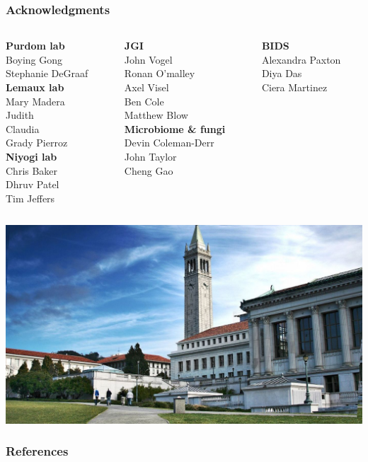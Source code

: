 \documentclass[xcolor=dvipsnames]{beamer}
\begin{document}
\begin{frame}
\frametitle{Acknowledgments}
\begin{center}
\begin{columns}
\begin{column}{0.3\linewidth}
\scriptsize
{\bf Purdom lab} \\
Boying Gong \\
Stephanie DeGraaf \\
\vspace{1em}
{\bf Lemaux lab} \\
Mary Madera \\
Judith \\
Claudia\\
Grady Pierroz\\
\vspace{1em}
{\bf Niyogi lab} \\
Chris Baker \\
Dhruv Patel \\
Tim Jeffers 
\end{column}
\begin{column}{0.3\linewidth}
\scriptsize
{\bf JGI} \\
John Vogel \\
Ronan O'malley \\
Axel Visel \\
Ben Cole \\
Matthew Blow \\
\vspace{1em}
{\bf Microbiome \& fungi} \\
Devin Coleman-Derr\\
John Taylor \\
Cheng Gao
\end{column}

\begin{column}{0.3\linewidth}
\scriptsize
{\bf BIDS} \\
Alexandra Paxton \\
Diya Das \\
Ciera Martinez
\end{column}
\end{columns}
\end{center}

\begin{center}
\hspace*{-1.5em}
\includegraphics[width=1.1\linewidth]{images/berkeley_campanile.jpeg}
\end{center}
\end{frame}

\begin{frame}
    \frametitle{References}
    
    
\end{frame}
\end{document}
